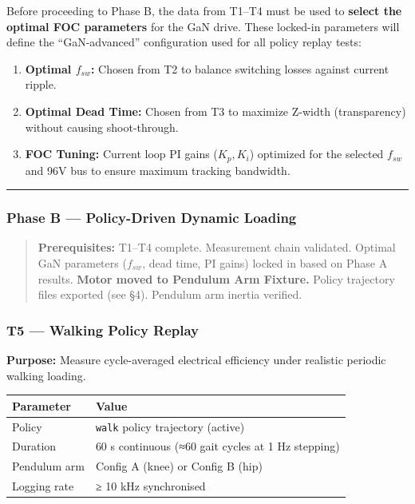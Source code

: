 \documentclass[
]{article}
\newcounter{none} %
\providecommand{\tightlist}{%
  \setlength{\itemsep}{0pt}\setlength{\parskip}{0pt}}
\begin{document}
Before proceeding to Phase B, the data from T1--T4 must be used to
\textbf{select the optimal FOC parameters} for the GaN drive. These
locked-in parameters will define the ``GaN-advanced'' configuration used
for all policy replay tests:

\begin{enumerate}
\def\labelenumi{\arabic{enumi}.}
\tightlist
\item
  \textbf{Optimal \(f_{sw}\):} Chosen from T2 to balance switching
  losses against current ripple.
\item
  \textbf{Optimal Dead Time:} Chosen from T3 to maximize Z-width
  (transparency) without causing shoot-through.
\item
  \textbf{FOC Tuning:} Current loop PI gains (\(K_p, K_i\)) optimized
  for the selected \(f_{sw}\) and 96V bus to ensure maximum tracking
  bandwidth.
\end{enumerate}

\begin{center}\rule{0.5\linewidth}{0.5pt}\end{center}

\subsubsection{Phase B --- Policy-Driven Dynamic
Loading}\label{phase-b-policy-driven-dynamic-loading}

\begin{quote}
\textbf{Prerequisites:} T1--T4 complete. Measurement chain validated.
Optimal GaN parameters (\(f_{sw}\), dead time, PI gains) locked in based
on Phase A results. \textbf{Motor moved to Pendulum Arm Fixture.} Policy
trajectory files exported (see §4). Pendulum arm inertia verified.
\end{quote}

\subsubsection{T5 --- Walking Policy
Replay}\label{t5-walking-policy-replay}

\textbf{Purpose:} Measure cycle-averaged electrical efficiency under
realistic periodic walking loading.

{\def\LTcaptype{none} %
\begin{longtable}[]{@{}ll@{}}
\toprule\noalign{}
Parameter & Value \\
\midrule\noalign{}
\endhead
\bottomrule\noalign{}
\endlastfoot
Policy & \texttt{walk} policy trajectory (active) \\
Duration & 60 s continuous (≈60 gait cycles at 1 Hz stepping) \\
Pendulum arm & Config A (knee) or Config B (hip) \\
Logging rate & ≥ 10 kHz synchronised \\
\end{longtable}
}
\end{document}

